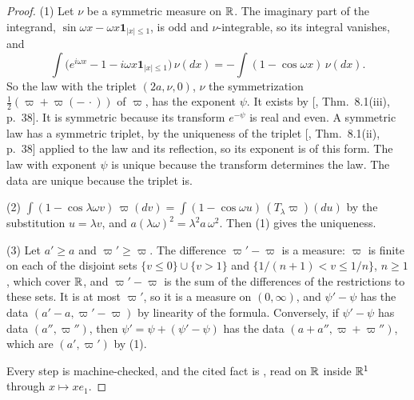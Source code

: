\begin{proof}
\leanok
{}
(1) Let $\nu$ be a symmetric \Levy{} measure on $\mathbb{R}$. The imaginary part of the integrand,
$\sin\omega x - \omega x\mathbf 1_{|x| \le 1}$, is odd and $\nu$-integrable, so its integral
vanishes, and
\[
  \int\bigl(e^{i\omega x} - 1 - i\omega x\mathbf 1_{|x| \le 1}\bigr)\,\nu(dx)
  = -\int(1 - \cos\omega x)\,\nu(dx).
\]
So the law with the triplet $(2a, \nu, 0)$, $\nu$ the symmetrization $\tfrac12(\varpi + \varpi(-\,\cdot))$
of $\varpi$, has the exponent $\psi$. It exists by [, Thm.~8.1(iii),
p.~38]. It is symmetric because its transform $e^{-\psi}$ is real and even. A symmetric law
has a symmetric triplet, by the uniqueness of the triplet [, Thm.~8.1(ii),
p.~38] applied to the law and its
reflection, so its exponent is of this form. The law with exponent $\psi$ is unique because the
transform determines the law. The data are unique because the triplet is.

(2) $\int(1 - \cos\lambda\omega v)\,\varpi(dv) = \int(1 - \cos\omega u)\,(T_\lambda\varpi)(du)$ by
the substitution $u = \lambda v$, and $a(\lambda\omega)^2 = \lambda^2a\,\omega^2$. Then (1) gives
the uniqueness.

(3) Let $a' \ge a$ and $\varpi' \ge \varpi$. The difference $\varpi' - \varpi$ is a measure: $\varpi$
is finite on each of the disjoint sets $\{v \le 0\} \cup \{v > 1\}$ and
$\{1/(n+1) < v \le 1/n\}$, $n \ge 1$, which cover $\mathbb{R}$, and $\varpi' - \varpi$ is the sum of the
differences of the restrictions to these sets. It is at most $\varpi'$, so it is a \Levy{} measure
on $(0,\infty)$, and $\psi' - \psi$ has the data $(a' - a, \varpi' - \varpi)$ by linearity of the
formula. Conversely, if $\psi' - \psi$ has data $(a'', \varpi'')$, then $\psi' = \psi + (\psi' - \psi)$
has the data $(a + a'', \varpi + \varpi'')$, which are $(a', \varpi')$ by (1).

Every step is machine-checked, and the cited fact is , read on $\mathbb{R}$ inside $\mathbb{R}^1$
through $x \mapsto xe_1$.
\end{proof}

